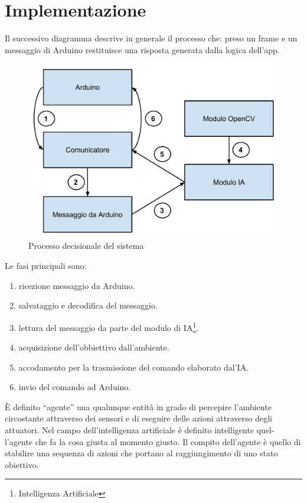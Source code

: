 \chapter{Implementazione}
\fancyfoot[C]{\thepage }
Il successivo diagramma descrive in generale il processo che: preso un frame e un messaggio
di Arduino restituisce una risposta generata dalla logica dell'app.
\begin{figure}[H] \center
\includegraphics[width=\textwidth]{immagini/schema_processo_new.pdf}
\caption{Processo decisionale del sistema} 
\end{figure}
Le fasi principali sono:
\begin{enumerate}
\item ricezione messaggio da Arduino.
\item salvataggio e decodifica del messaggio.
\item lettura del messaggio da parte del modulo di IA\footnote{Intelligenza Artificiale}.
\item acquisizione dell'obbiettivo dall'ambiente.
\item accodamento per la trasmissione del comando elaborato dal'IA.
\item invio del comando ad Arduino.
\end{enumerate}




È definito ``agente'' una qualunque entità in grado di percepire l'ambiente
circostante attraverso dei sensori e di eseguire delle azioni attraverso degli
attuatori. Nel campo dell'intelligenza artificiale è definito intelligente quel-
l'agente che fa la cosa giusta al momento giusto. Il compito dell'agente è
quello di stabilire una sequenza di azioni che portano al raggiungimento di
uno stato obiettivo.\cite{agente}
